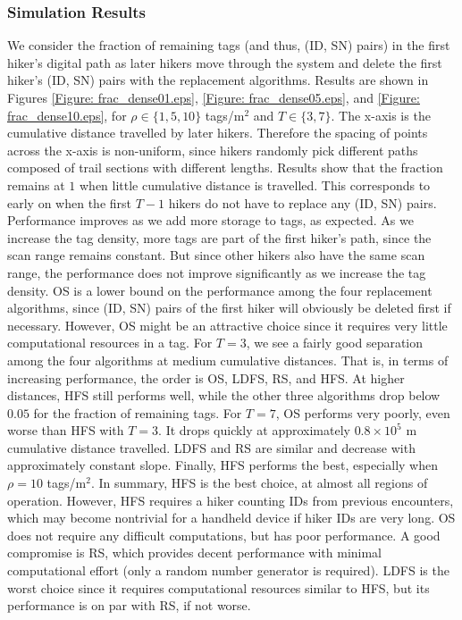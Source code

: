 \subsubsection{\textbf{Simulation Results}}
We consider the fraction of remaining tags (and thus, (ID, SN) pairs) in the first hiker's digital path as later hikers move through the system and delete the first hiker's (ID, SN) pairs with the replacement algorithms.  Results are shown in Figures \ref{Figure: frac_dense01.eps}, \ref{Figure: frac_dense05.eps}, and \ref{Figure: frac_dense10.eps}, for $\rho \in \{1, 5, 10\}$ tags/m$^2$ and $T \in \{3, 7\}$. The x-axis is the cumulative distance travelled by later hikers. Therefore the spacing of points across the x-axis is non-uniform, since hikers randomly pick different paths composed of trail sections with different lengths. Results show that the fraction remains at $1$ when little cumulative distance is travelled. This corresponds to early on when the first $T-1$ hikers do not have to replace any (ID, SN) pairs. Performance improves as we add more storage to tags, as expected. As we increase the tag density, more tags are part of the first hiker's path, since the scan range remains constant. But since other hikers also have the same scan range, the performance does not improve significantly as we increase the tag density. OS is a lower bound on the performance among the four replacement algorithms, since (ID, SN) pairs of the first hiker will obviously be deleted first if necessary.  However, OS might be an attractive choice since it requires very little computational resources in a tag.  For $T=3$, we see a fairly good separation among the four algorithms at medium cumulative distances.  That is, in terms of increasing performance, the order is OS, LDFS, RS, and HFS.  At higher distances, HFS still performs well, while the other three algorithms drop below $0.05$ for the fraction of remaining tags.  For $T=7$, OS performs very poorly, even worse than HFS with $T=3$.  It drops quickly at approximately $0.8 \times 10^5$ m cumulative distance travelled.  LDFS and RS are similar and decrease with approximately constant slope.  Finally, HFS performs the best, especially when $\rho = 10$ tags/m$^2$.  In summary, HFS is the best choice, at almost all regions of operation.  However, HFS requires a hiker counting IDs from previous encounters, which may become nontrivial for a handheld device if hiker IDs are very long.  OS does not require any difficult computations, but has poor performance.  A good compromise is RS, which provides decent performance with minimal computational effort (only a random number generator is required).  LDFS is the worst choice since it requires computational resources similar to HFS, but its performance is on par with RS, if not worse.

